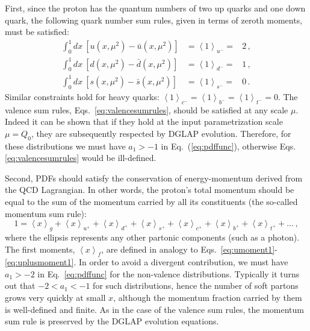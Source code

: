 First, since the proton has the quantum numbers of two up quarks and one 
down quark, the following quark number sum rules, given in terms of zeroth
moments, must be satisfied: 
\begin{eqnarray}
\int_{0}^{1}dx\ \left[u(x,\mu^2)-\bar{u}(x,\mu^2)\right] 
& =\left\langle 1\right\rangle _{u^{-}}= & 2 \, ,\nonumber \\
\int_{0}^{1}dx\ \left[d(x,\mu^2)-\bar{d}(x,\mu^2)\right] 
& =\left\langle 1\right\rangle _{d^{-}}= & 1 \, ,
\label{eq:valencesumrules}\\
\int_{0}^{1}dx\ \left[s(x,\mu^2)-\bar{s}(x,\mu^2)\right] 
& =\left\langle 1\right\rangle _{s^{-}}= & 0 \, .\nonumber
\end{eqnarray}
%
Similar constraints hold for heavy quarks: 
$\left\langle 1\right\rangle _{c^{-}}=\left\langle 1\right\rangle _{b^{-}}
=\left\langle 1\right\rangle _{t^{-}}=0$.
%
The valence sum rules, Eqs.~\eqref{eq:valencesumrules}, should be satisfied at 
any scale $\mu$. 
%
Indeed it can be shown that if they hold at the input parametrization scale 
$\mu=Q_0$, they are subsequently respected by DGLAP evolution.
%
Therefore, for these distributions we must have $a_1>-1$ in
Eq.~(\ref{eq:pdffunc}), otherwise Eqs.\eqref{eq:valencesumrules} 
would be ill-defined.

Second, PDFs should satisfy the conservation of energy-momentum derived from
the QCD Lagrangian.
%
In other words, the proton's total momentum should be equal 
to the sum of the momentum carried by all its constituents
(the so-called momentum sum rule):
\begin{equation}
\label{eq:mom}
1 
= 
\left\langle x\right\rangle _{g}
+
\left\langle x\right\rangle _{u^{+}}
+
\left\langle x\right\rangle _{d^{+}}
+
\left\langle x\right\rangle _{s^{+}}
+
\left\langle x\right\rangle _{c^{+}}
+
\left\langle x\right\rangle _{b^{+}}
+
\left\langle x\right\rangle _{t^{+}}+\ldots\,,
\end{equation}
%
where the ellipsis represents any other partonic components (such
as a photon). 
%
The first moments, $\left\langle x\right\rangle _{f}$, are defined in analogy 
to Eqs.~\eqref{eq:umoment1}-\eqref{eq:uplusmoment1}. 
%
In order to avoid a divergent contribution, we must have $a_1>-2$ in 
Eq.~\eqref{eq:pdffunc} for the non-valence distributions.
%
Typically it turns out that $-2<a_1<-1$ for such distributions, hence 
the number of soft partons grows very quickly at small $x$, although the 
momentum fraction carried by them is well-defined and finite.
%
As in the case of the valence sum rules, the momentum
sum rule is preserved by the DGLAP evolution equations.


